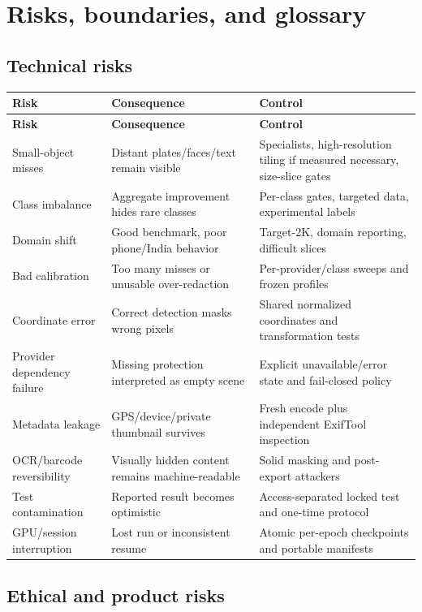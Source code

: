 \chapter{Risks, boundaries, and glossary}

\section{Technical risks}

\begin{longtable}{@{}L{39mm}L{56mm}L{51mm}@{}}
\toprule
\textbf{Risk} & \textbf{Consequence} & \textbf{Control} \\
\midrule
\endfirsthead
\toprule
\textbf{Risk} & \textbf{Consequence} & \textbf{Control} \\
\midrule
\endhead
Small-object misses & Distant plates/faces/text remain visible & Specialists, high-resolution tiling if measured necessary, size-slice gates \\
Class imbalance & Aggregate improvement hides rare classes & Per-class gates, targeted data, experimental labels \\
Domain shift & Good benchmark, poor phone/India behavior & Target-2K, domain reporting, difficult slices \\
Bad calibration & Too many misses or unusable over-redaction & Per-provider/class sweeps and frozen profiles \\
Coordinate error & Correct detection masks wrong pixels & Shared normalized coordinates and transformation tests \\
Provider dependency failure & Missing protection interpreted as empty scene & Explicit unavailable/error state and fail-closed policy \\
Metadata leakage & GPS/device/private thumbnail survives & Fresh encode plus independent ExifTool inspection \\
OCR/barcode reversibility & Visually hidden content remains machine-readable & Solid masking and post-export attackers \\
Test contamination & Reported result becomes optimistic & Access-separated locked test and one-time protocol \\
GPU/session interruption & Lost run or inconsistent resume & Atomic per-epoch checkpoints and portable manifests \\
\bottomrule
\end{longtable}

\section{Ethical and product risks}

